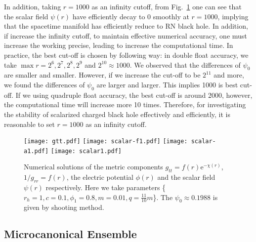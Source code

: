 \documentclass[pr, twocolumn, preprintnumbers, showpacs,footnoteadded, superscriptaddress,nofootinbib,longbibliography]{revtex4-1}
\newcommand{\te}{\mathrm{e}}
\begin{document}
In addition, taking $r =1000$ as an infinity cutoff, from Fig.~\ref{fig1} one can see that the scalar field $\psi(r)$ have efficiently decay to $0$ smoothly at $r=1000$, implying that the spacetime manifold has efficiently reduce to RN black hole. In addition, if increase the infinity cutoff, to maintain effective numerical accuracy, one must increase the working precise, leading to increase the computational time. In practice, the best cut-off is chosen by following way: in double float accuracy, we take $\max r=2^6,2^7,2^8,2^9$ and $2^{10}\approx1000$. We observed that the differences of $\psi_0$ are smaller and smaller. However, if we increase the cut-off to be $2^{11}$ and more, we found the differences of $\psi_0$ are larger and larger. This implies 1000 is best cut-off. If we using quadruple float accuracy, the best cut-off is around 2000, however, the computational time will increase more 10 times. Therefore, for investigating the stability of scalarized charged black hole effectively and efficiently, it is reasonable to set $r=1000$ as an infinity cutoff.
\begin{figure}[htpb]
  \centering
  \texttt{[image: gtt.pdf]}
  \texttt{[image: scalar-f1.pdf]}
  \texttt{[image: scalar-a1.pdf]}
  \texttt{[image: scalar1.pdf]}
 \caption{Numerical solutions of the metric components $g_{tt}=f(r)\te^{-\chi(r)}$, $1/g_{rr}=f(r)$, the electric potential $\phi(r)$ and the scalar field $\psi (r)$ respectively. Here we take parameters \{$r_h=1, c=0.1, \phi_1=0.8, m=0.01, q=\frac{11}{10}m$\}. The $\psi_0\approx0.1988$ is given by shooting method. }\label{fig1}
\end{figure}


\subsection{Microcanonical Ensemble} \label{micensem}
\end{document}
